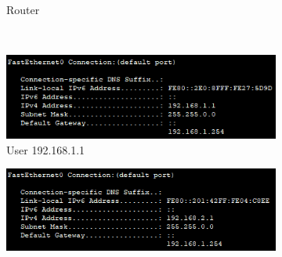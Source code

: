 \begin{figure}[!htb]
\begin{subfigure}{.45\textwidth}
        \caption{Router}
    \end{subfigure}
    ~
    \begin{subfigure}{.45\textwidth}
        \includegraphics[width=\textwidth,height=\textwidth,keepaspectratio]{./img/test1/user1.png}
        \caption{User 192.168.1.1}
    \end{subfigure}
    \begin{subfigure}{.45\textwidth}
        \includegraphics[width=\textwidth,height=\textwidth,keepaspectratio]{./img/test1/user2.png}

\end{subfigure}
\end{figure}
